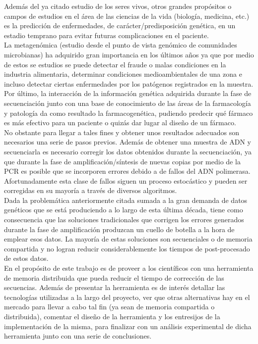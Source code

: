 \documentclass[conference]{IEEEtran}
\begin{document}
Además del ya citado estudio de los seres vivos, otros grandes propósitos o campos de estudios en el área de las ciencias de la vida (biología, medicina, etc.) es la predicción de enfermedades, de carácter/predisposición genética, en un estadio temprano para evitar futuras complicaciones en el paciente. \\
La metagenómica (estudio desde el punto de vista genómico de comunidades microbianas) ha adquirido gran importancia en los últimos años ya que por medio de estos se estudios se puede detectar el fraude o malas condiciones en la industria alimentaria, determinar condiciones medioambientales de una zona e incluso detectar ciertas enfermedades por los patógenos registrados en la muestra.\\
Por último, la interacción de la información genética adquirida durante la fase de secuenciación junto con una base de conocimiento de las áreas de la farmacología y patología da como resultado la farmacogenética, pudiendo predecir qué fármaco es más efectivo para un paciente o quizás dar lugar al diseño de un fármaco.
\\

No obstante para llegar a tales fines y obtener unos resultados adecuados son necesarios una serie de pasos previos. Además de obtener una muestra de ADN y secuenciarla es necesario corregir los datos obtenidos durante la secuenciación, ya que durante la fase de amplificación/síntesis de nuevas copias por medio de la PCR es posible que se incorporen errores debido a de fallos del ADN polimerasa.\\ Afortunadamente esta clase de fallos siguen un proceso estocástico y pueden ser corregidas en su mayoría a través de diversos algoritmos.
\\

Dada la problemática anteriormente citada sumada a la gran demanda de datos genéticos que se está produciendo a lo largo de esta última década, tiene como consecuencia que las soluciones tradicionales que corrigen los errores generados durante la fase de amplificación produzcan un cuello de botella a la hora de emplear esos datos. La mayoría de estas soluciones son secuenciales o de memoria compartida y no logran reducir considerablemente los tiempos de post-procesado de estos datos.
\\

En el propósito de este trabajo es de proveer a los científicos con una herramienta de memoria distribuida que pueda reducir el tiempo de corrección de las secuencias. Además de presentar la herramienta es de interés detallar las tecnologías utilizadas a la largo del proyecto, ver que otras alternativas hay en el mercado para llevar a cabo tal fin (ya sean de memoria compartida o distribuida), comentar el diseño de la herramienta y los entresijos de la implementación de la misma, para finalizar con un análisis experimental de dicha herramienta junto con una serie de conclusiones.
\end{document}
